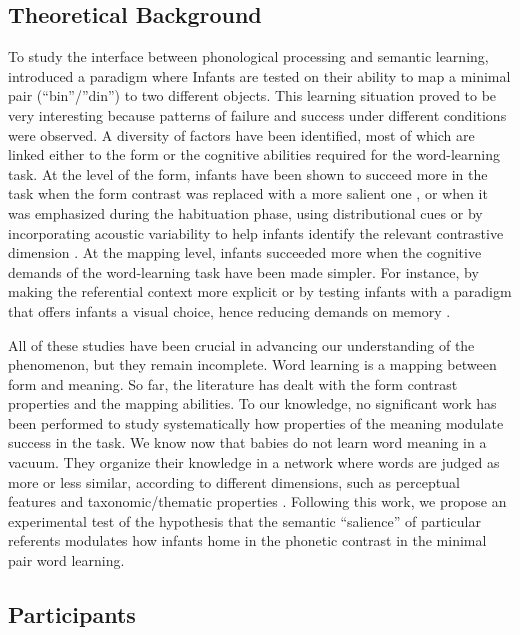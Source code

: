 \documentclass[12pt]{article}
\begin{document}
\subsection{Theoretical Background}

To study the interface between phonological processing and semantic learning,  introduced a paradigm where Infants are tested on their ability to map a minimal pair (``bin''/''din'') to two different objects. This learning situation proved to be very interesting because patterns of failure and success under different conditions were observed.  A diversity of factors have been identified, most of which are linked either to the form or the cognitive abilities required for the word-learning task. At the level of the form, infants have been shown to succeed more in the task when the form contrast was replaced with a more salient one \cite{curtin2009}, or when it was emphasized during the habituation phase, using distributional cues \cite{thiessen2007} or by incorporating acoustic variability to help infants identify the relevant contrastive dimension \cite{roost2009}.
At the mapping level, infants succeeded more when the cognitive demands of the word-learning task have been made simpler. For instance, by making the referential context more explicit \cite{fennel2010}
or by testing infants with a paradigm that offers infants a visual choice, hence reducing demands on memory \cite{yoshida2009}.

All of these studies have been crucial in advancing our understanding of the phenomenon, but they remain incomplete. Word learning is a mapping between form and meaning. So far, the literature has dealt with the form contrast properties and the mapping abilities. To our knowledge, no significant work has been performed to study systematically how properties of the meaning modulate success in the task. We know now that babies do not learn word meaning in a vacuum. They organize their knowledge in a network where words are judged as more or less similar, according to different dimensions, such as perceptual features
\cite{wojcik2013}
and taxonomic/thematic properties 
\cite{arias-trejo2013}. Following this work, we propose an experimental test of the hypothesis that the semantic ``salience'' of particular referents modulates how infants home in the phonetic contrast in the minimal pair word learning. 


\subsection{Participants}
\end{document}
